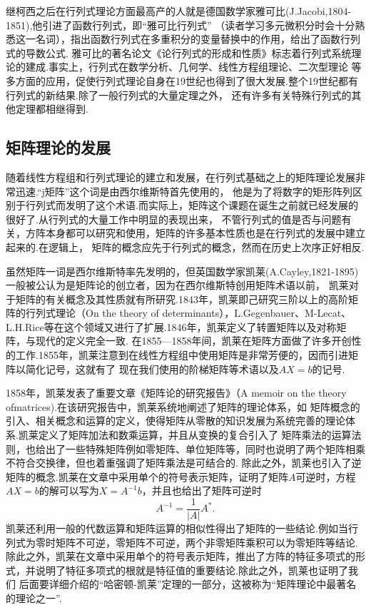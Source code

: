 \documentclass{ctexbook}
\begin{document}
继柯西之后在行列式理论方面最高产的人就是德国数学家雅可比(J.Jacobi,1804-1851),他引进了函数行列式，即``雅可比行列式''
（读者学习多元微积分时会十分熟悉这一名词），指出函数行列式在多重积分的变量替换中的作用，给出了函数行列式的导数公式.
雅可比的著名论文《论行列式的形成和性质》标志着行列式系统理论的建成.事实上，行列式在数学分析、几何学、线性方程组理论、二次型理论
等多方面的应用，促使行列式理论自身在19世纪也得到了很大发展.整个19世纪都有行列式的新结果.除了一般行列式的大量定理之外，
还有许多有关特殊行列式的其他定理都相继得到.

\subsection{矩阵理论的发展}
随着线性方程组和行列式理论的建立和发展，在行列式基础之上的矩阵理论发展非常迅速.``j矩阵''这个词是由西尔维斯特首先使用的，
他是为了将数字的矩形阵列区别于行列式而发明了这个术语.而实际上，矩阵这个课题在诞生之前就已经发展的很好了.从行列式的大量工作中明显的表现出来，
不管行列式的值是否与问题有关，方阵本身都可以研究和使用，矩阵的许多基本性质也是在行列式的发展中建立起来的.在逻辑上，
矩阵的概念应先于行列式的概念，然而在历史上次序正好相反.

虽然矩阵一词是西尔维斯特率先发明的，但英国数学家凯莱(A.Cayley,1821-1895)一般被公认为是矩阵论的创立者，因为在西尔维斯特创用矩阵术语以前，
凯莱对于矩阵的有关概念及其性质就有所研究.1843年，凯莱即己研究三阶以上的高阶矩阵的行列式理论（On the theory of
determinants），L.Gegenbauer、M-Lecat、L.H.Rice等在这个领域又进行了扩展.1846年，凯莱定义了转置矩阵以及对称矩阵，与现代的定义完全一致.
在1855—1858年间，凯莱在矩阵方面做了许多开创性的工作.1855年，凯莱注意到在线性方程组中使用矩阵是非常芳便的，因而引进矩阵以简化记号，这就有了
现在我们使用的阶梯矩阵等术语以及$AX=b$的记号.

1858年，凯莱发表了重要文章《矩阵论的研究报告》（A memoir on the theory ofmatrices).在该研究报告中，凯莱系统地阐述了矩阵的理论体系，如
矩阵概念的引入、相关概念和运算的定义，使得矩阵从零散的知识发展为系统完善的理论体系.凯莱定义了矩阵加法和数乘运算，并且从变换的复合引入了
矩阵乘法的运算法则，也给出了一些特殊矩阵例如零矩阵、单位矩阵等，同时也说明了两个矩阵相乘不符合交换律，但也着重强调了矩阵乘法是可结合的.
除此之外，凯莱也引入了逆矩阵的概念.凯莱在文章中采用单个的符号表示矩阵，证明了矩阵$A$可逆时，方程$AX=b$的解可以写为$X=A^{-1}b$，并且也给出了矩阵可逆时
\[A^{-1}=\frac{1}{|A|}A^*.\]
凯莱还利用一般的代数运算和矩阵运算的相似性得出了矩阵的一些结论.例如当行列式为零时矩阵不可逆，零矩阵不可逆，两个非零矩阵乘积可以为零矩阵等结论.
除此之外，凯莱在文章中采用单个的符号表示矩阵，推出了方阵的特征多项式的形式，并说明了特征多项式的根就是特征值的重要结论.除此之外，凯莱也证明了我们
后面要详细介绍的``哈密顿-凯莱''定理的一部分，这被称为``矩阵理论中最著名的理论之一''.
\end{document}
